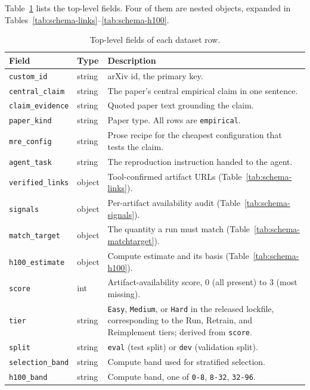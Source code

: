 \documentclass{article} %
\begin{document}
Table~\ref{tab:schema-toplevel} lists the top-level fields. Four of them are
nested objects, expanded in
Tables~\ref{tab:schema-links}--\ref{tab:schema-h100}.

\begin{table}[t]
\caption{Top-level fields of each dataset row.}
\label{tab:schema-toplevel}
\begin{center}
\small
\begin{tabular}{@{}llp{7.2cm}@{}}
\toprule
Field & Type & Description \\
\midrule
\texttt{custom\_id} & string & arXiv id, the primary key. \\
\texttt{central\_claim} & string & The paper's central empirical claim in one sentence. \\
\texttt{claim\_evidence} & string & Quoted paper text grounding the claim. \\
\texttt{paper\_kind} & string & Paper type. All rows are \texttt{empirical}. \\
\texttt{mre\_config} & string & Prose recipe for the cheapest configuration that tests the claim. \\
\texttt{agent\_task} & string & The reproduction instruction handed to the agent. \\
\texttt{verified\_links} & object & Tool-confirmed artifact URLs (Table~\ref{tab:schema-links}). \\
\texttt{signals} & object & Per-artifact availability audit (Table~\ref{tab:schema-signals}). \\
\texttt{match\_target} & object & The quantity a run must match (Table~\ref{tab:schema-matchtarget}). \\
\texttt{h100\_estimate} & object & Compute estimate and its basis (Table~\ref{tab:schema-h100}). \\
\texttt{score} & int & Artifact-availability score, 0 (all present) to 3 (most missing). \\
\texttt{tier} & string & \texttt{Easy}, \texttt{Medium}, or \texttt{Hard} in the released lockfile, corresponding to the Run, Retrain, and Reimplement tiers; derived from \texttt{score}. \\
\texttt{split} & string & \texttt{eval} (test split) or \texttt{dev} (validation split). \\
\texttt{selection\_band} & string & Compute band used for stratified selection. \\
\texttt{h100\_band} & string & Compute band, one of \texttt{0-8}, \texttt{8-32}, \texttt{32-96}. \\

\end{tabular}
\end{center}
\end{table}
\end{document}
